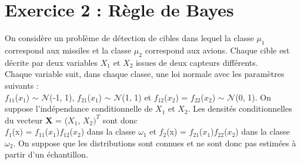 \documentclass[a4paper, 10pt]{article}
\begin{document}
\newpage
\section*{Exercice 2 : Règle de Bayes}
On considère un problème de détection de cibles dans lequel la classe $\mu_{1}$ correspond aux missiles et
la classe $\mu_{2}$ correspond aux avions.
Chaque cible est décrite par deux variables \textit{$X_{1}$} et \textit{$X_{2}$} issues de deux capteurs différents.\\
Chaque variable suit, dans chaque classe, une loi normale avec les paramètres suivants :\\
\textit{$f_{11}$}(\textit{$x_{1}$}) $\sim$ $\mathcal{N}$(-1, 1), \textit{$f_{21}$}(\textit{$x_{1}$}) $\sim$ $\mathcal{N}$(1, 1) et
\textit{$f_{12}$}(\textit{$x_{2}$}) = \textit{$f_{22}$}(\textit{$x_{2}$}) $\sim$ $\mathcal{N}$(0, 1).
On suppose l'indépendance conditionnelle de \textit{$X_{1}$} et \textit{$X_{2}$}.
Les densités conditionnelles du vecteur \textbf{X} = (\textit{$X_{1}$}, \textit{$X_{2}$}$)^T$ sont donc\\
\textit{$f_{1}$}(x) = \textit{$f_{11}$}($x_{1}$)\textit{$f_{12}$}($x_{2}$) dans la classe $\omega_{1}$ et
\textit{$f_{2}$}(x) = \textit{$f_{21}$}($x_{1}$)\textit{$f_{22}$}($x_{2}$) dans la classe $\omega_{2}$.
On suppose que les distributions sont connues et ne sont donc pas estimées à partir d'un échantillon.\\
\end{document}
